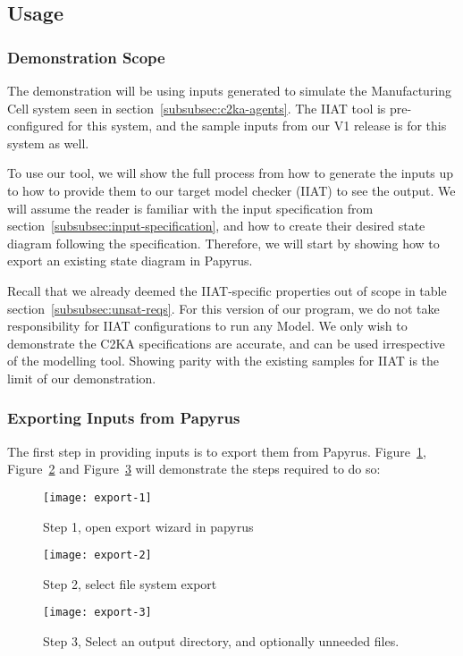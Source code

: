 \subsection{Usage}\label{subsec:usage}
\subsubsection{Demonstration Scope}\label{subsubsec:scope}
The demonstration will be using inputs generated to simulate the Manufacturing Cell system seen in section~\ref{subsubsec:c2ka-agents}.
The IIAT tool is pre-configured for this system, and the sample inputs from our V1 release is for this system as well.

To use our tool, we will show the full process from how to generate the inputs up to how to provide them to our target model checker (IIAT) to see the output.
We will assume the reader is familiar with the input specification from section~\ref{subsubsec:input-specification},
and how to create their desired state diagram following the specification.
Therefore, we will start by showing how to export an existing state diagram in Papyrus.

Recall that we already deemed the IIAT-specific properties out of scope in table section~\ref{subsubsec:unsat-reqs}.
For this version of our program, we do not take responsibility for IIAT configurations to run any Model.
We only wish to demonstrate the C2KA specifications are accurate, and can be used irrespective of the modelling tool.
Showing parity with the existing samples for IIAT is the limit of our demonstration.


\subsubsection{Exporting Inputs from Papyrus}
The first step in providing inputs is to export them from Papyrus.
Figure~\ref{fig:export-1}, Figure~\ref{fig:export-2} and Figure~\ref{fig:export-3} will demonstrate the steps required to do so:
\begin{figure}[ht]
    \centering
    \texttt{[image: export-1]}
    \caption{Step 1, open export wizard in papyrus}
    \label{fig:export-1}
\end{figure}
\begin{figure}[ht]
    \centering
    \texttt{[image: export-2]}
    \caption{Step 2, select file system export}
    \label{fig:export-2}
\end{figure}
\begin{figure}[ht]
    \centering
    \texttt{[image: export-3]}
    \caption{Step 3, Select an output directory, and optionally unneeded files.}
    \label{fig:export-3}
\end{figure}


